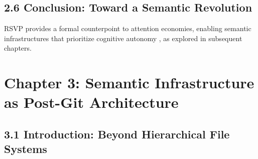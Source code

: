 \documentclass[12pt]{article}
\begin{document}
\subsection{2.6 Conclusion: Toward a Semantic Revolution}

RSVP provides a formal counterpoint to attention economies, enabling semantic infrastructures that prioritize cognitive autonomy \citep{whitehead1978}, as explored in subsequent chapters.

\section{Chapter 3: Semantic Infrastructure as Post-Git Architecture}

\subsection{3.1 Introduction: Beyond Hierarchical File Systems}
\end{document}
